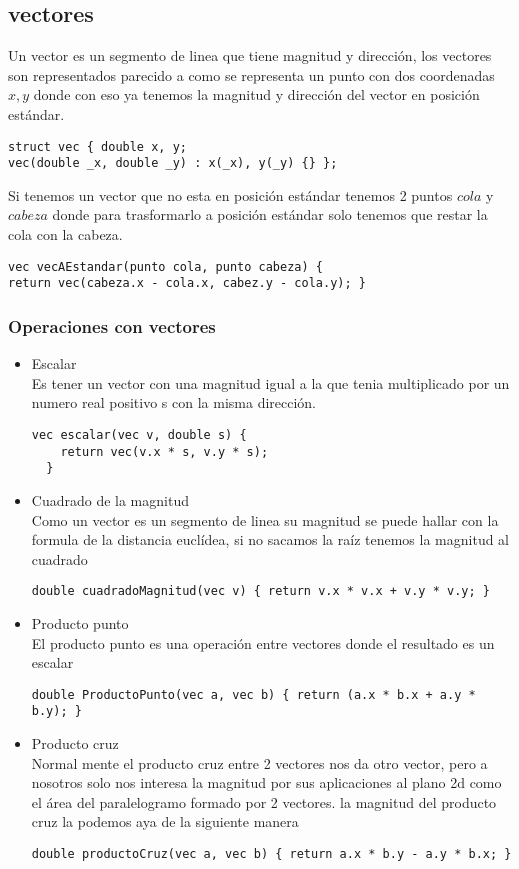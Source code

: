 \subsection{vectores}
Un vector es un segmento de linea que tiene magnitud y dirección, los vectores son representados parecido a como se
representa un punto con dos coordenadas $x, y$ donde con eso ya tenemos la magnitud y dirección del vector en posición estándar.
\begin{lstlisting}[style=C]
struct vec { double x, y;
vec(double _x, double _y) : x(_x), y(_y) {} };
\end{lstlisting}
Si tenemos un vector que no esta en posición estándar tenemos 2 puntos $cola$ y $cabeza$ donde para trasformarlo a posición estándar
solo tenemos que restar la cola con la cabeza.
\begin{lstlisting}[style=C]
vec vecAEstandar(punto cola, punto cabeza) {
return vec(cabeza.x - cola.x, cabez.y - cola.y); }
\end{lstlisting}
\subsubsection{Operaciones con vectores}
\begin{itemize}
  \item Escalar
  \\
  Es tener un vector con una magnitud igual a la que tenia multiplicado por un numero real positivo s con la misma dirección.
  \begin{lstlisting}[style=C]
  vec escalar(vec v, double s) {
    return vec(v.x * s, v.y * s);
  }
  \end{lstlisting}
  \item Cuadrado de la magnitud
  \\
  Como un vector es un segmento de linea su magnitud se puede hallar con la formula de la distancia euclídea, si
  no sacamos la raíz tenemos la magnitud al cuadrado
  \begin{lstlisting}[style=C]
  double cuadradoMagnitud(vec v) { return v.x * v.x + v.y * v.y; }
  \end{lstlisting}
  \item Producto punto
  \\
  El producto punto es una operación entre vectores donde el resultado es un escalar
  \begin{lstlisting}[style=C]
  double ProductoPunto(vec a, vec b) { return (a.x * b.x + a.y * b.y); }
  \end{lstlisting}
  \item Producto cruz
  \\
  Normal mente el producto cruz entre 2 vectores nos da otro vector, pero a nosotros solo nos interesa la magnitud por sus
  aplicaciones al plano 2d como el área del paralelogramo formado por 2 vectores. la magnitud del producto cruz la podemos aya de la
  siguiente manera
  \begin{lstlisting}[style=C]
  double productoCruz(vec a, vec b) { return a.x * b.y - a.y * b.x; }
  \end{lstlisting}
\end{itemize}

